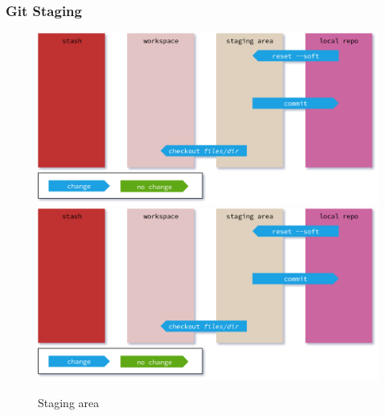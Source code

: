 \begin{frame}[fragile]
    \frametitle{Git Staging}
    \begin{figure}
        \begin{center}
            {
                \includegraphics[width=1\textwidth,keepaspectratio]{./images/GitAreas-Staging.png}
            }
            {
                \includegraphics[height=0.75\textheight,keepaspectratio]{./images/GitAreas-Staging.png}
            }
            \caption{Staging area}
        \end{center}
    \end{figure}
\end{frame}

